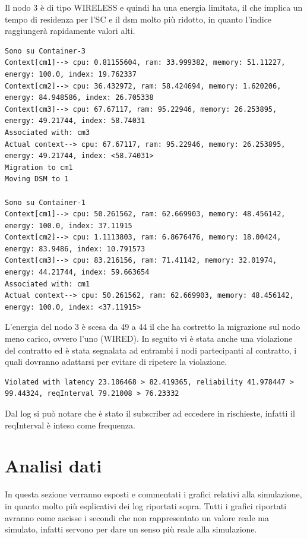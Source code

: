 Il nodo 3 è di tipo WIRELESS e quindi ha una energia limitata, il che implica un tempo di residenza per l'SC e il dsm molto più ridotto, in quanto l'indice raggiungerà rapidamente valori alti.
\begin{lstlisting}
Sono su Container-3
Context[cm1]--> cpu: 0.81155604, ram: 33.999382, memory: 51.11227, energy: 100.0, index: 19.762337
Context[cm2]--> cpu: 36.432972, ram: 58.424694, memory: 1.620206, energy: 84.948586, index: 26.705338
Context[cm3]--> cpu: 67.67117, ram: 95.22946, memory: 26.253895, energy: 49.21744, index: 58.74031
Associated with: cm3
Actual context--> cpu: 67.67117, ram: 95.22946, memory: 26.253895, energy: 49.21744, index: <58.74031>
Migration to cm1
Moving DSM to 1

Sono su Container-1
Context[cm1]--> cpu: 50.261562, ram: 62.669903, memory: 48.456142, energy: 100.0, index: 37.11915
Context[cm2]--> cpu: 1.1113803, ram: 6.8676476, memory: 18.00424, energy: 83.9486, index: 10.791573
Context[cm3]--> cpu: 83.216156, ram: 71.41142, memory: 32.01974, energy: 44.21744, index: 59.663654
Associated with: cm1
Actual context--> cpu: 50.261562, ram: 62.669903, memory: 48.456142, energy: 100.0, index: <37.11915>
\end{lstlisting}
L'energia del nodo 3 è scesa da 49 a 44 il che ha costretto la migrazione sul nodo meno carico, ovvero l'uno (WIRED). In seguito vi è stata anche una violazione del contratto ed è stata segnalata ad entrambi i nodi partecipanti al contratto, i quali dovranno adattarsi per evitare di ripetere la violazione.
\begin{lstlisting}
Violated with latency 23.106468 > 82.419365, reliability 41.978447 > 99.44324, reqInterval 79.21008 > 76.23332
\end{lstlisting}
Dal log si può notare che è stato il subscriber ad eccedere in rischieste, infatti il reqInterval è inteso come frequenza.
\section{Analisi dati}
In questa sezione verranno esposti e commentati i grafici relativi alla simulazione, in quanto molto più esplicativi dei log riportati sopra. Tutti i grafici riportati avranno come ascisse i secondi che non rappresentato un valore reale ma simulato, infatti servono per dare un senso più reale alla simulazione. 
